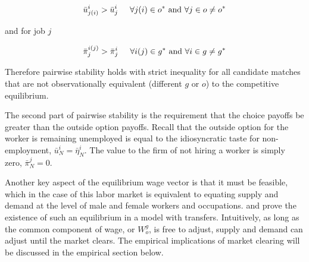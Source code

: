 \documentclass[11pt]{article}
\begin{document}
$$\bar{u}^{i}_{j(i)} > \bar{u}^{i}_{j} \hspace{5mm} \forall j(i) \in o^* \text{  and  } \forall j \in o \neq o^*$$

and for job $j$

$$\bar{\pi}^{i(j)}_{j} > \bar{\pi}^{i}_j \hspace{5mm} \forall i(j) \in g^* \text{  and  } \forall i \in g \neq g^*$$

Therefore pairwise stability holds with strict inequality for all candidate matches that are not observationally equivalent (different $g$ or $o$) to the competitive equilibrium.

The second part of pairwise stability is the requirement that the choice payoffs be greater than the outside option payoffs. Recall that the outside option for the worker is remaining unemployed is equal to the idiosyncratic taste for non-employment, $ \bar{u}^i_N = \bar{\eta}^i_N$. The value to the firm of not hiring a worker is simply zero, $\bar{\pi}^j_N = 0$.



Another key aspect of the equilibrium wage vector is that it must be feasible, which in the case of this labor market is equivalent to equating supply and demand at the level of male and female workers and occupations.  and  prove the existence of such an equilibrium in a model with transfers. Intuitively, as long as the common component of wage, or $W^g_o$, is free to adjust, supply and demand can adjust until the market clears. The empirical implications of market clearing will be discussed in the empirical section below.


\end{document}
